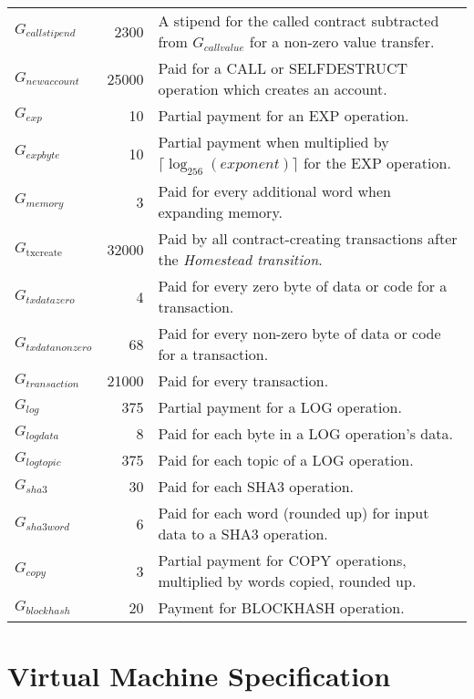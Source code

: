 \documentclass[9pt,oneside]{amsart}
\begin{document}
\begin{tabular*}{\columnwidth}[h]{lrl}
$G_{callstipend}$ & 2300 & A stipend for the called contract subtracted from $G_{callvalue}$ for a non-zero value transfer. \\
$G_{newaccount}$ & 25000 & Paid for a {\small CALL} or {\small SELFDESTRUCT} operation which creates an account. \\
$G_{exp}$ & 10 & Partial payment for an {\small EXP} operation. \\
$G_{expbyte}$ & 10 & Partial payment when multiplied by $\lceil\log_{256}(exponent)\rceil$ for the {\small EXP} operation. \\
$G_{memory}$ & 3 & Paid for every additional word when expanding memory. \\
$G_\text{txcreate}$ & 32000 & Paid by all contract-creating transactions after the {\it Homestead transition}.\\
$G_{txdatazero}$ & 4 & Paid for every zero byte of data or code for a transaction. \\
$G_{txdatanonzero}$ & 68 & Paid for every non-zero byte of data or code for a transaction. \\
$G_{transaction}$ & 21000 & Paid for every transaction. \\
$G_{log}$ & 375 & Partial payment for a {\small LOG} operation. \\
$G_{logdata}$ & 8 & Paid for each byte in a {\small LOG} operation's data. \\
$G_{logtopic}$ & 375 & Paid for each topic of a {\small LOG} operation. \\
$G_{sha3}$ & 30 & Paid for each {\small SHA3} operation. \\
$G_{sha3word}$ & 6 & Paid for each word (rounded up) for input data to a {\small SHA3} operation. \\
$G_{copy}$ & 3 & Partial payment for {\small *COPY} operations, multiplied by words copied, rounded up. \\
$G_{blockhash}$ & 20 & Payment for {\small BLOCKHASH} operation. \\

\bottomrule
\end{tabular*}

\section{Virtual Machine Specification}\label{app:vm}
\end{document}
